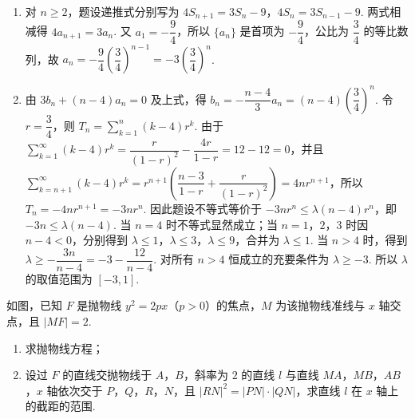 \begin{solution}
\begin{enumerate}
\item 对 \(n\geq2\)，题设递推式分别写为
\(4S_{n+1}=3S_n-9\)，\(4S_n=3S_{n-1}-9\). 两式相减得 \(4a_{n+1}=3a_n\). 又 \(a_1=-\dfrac94\)，所以 \(\{a_n\}\) 是首项为 \(-\dfrac94\)，公比为 \(\dfrac34\) 的等比数列，故
\(a_n=-\dfrac94\left(\dfrac34\right)^{n-1}=-3\left(\dfrac34\right)^n\).

\item 由 \(3b_n+(n-4)a_n=0\) 及上式，得
\(b_n=-\dfrac{n-4}{3}a_n=(n-4)\left(\dfrac34\right)^n\). 令 \(r=\dfrac34\)，则
\(T_n=\sum_{k=1}^{n}(k-4)r^k\). 由于
\(\sum_{k=1}^{\infty}(k-4)r^k=\dfrac r{(1-r)^2}-\dfrac{4r}{1-r}=12-12=0\)，并且
\(\sum_{k=n+1}^{\infty}(k-4)r^k=r^{n+1}\left(\dfrac{n-3}{1-r}+\dfrac r{(1-r)^2}\right)=4nr^{n+1}\)，所以 \(T_n=-4nr^{n+1}=-3nr^n\).
因此题设不等式等价于
\(-3nr^n\leq\lambda(n-4)r^n\)，即 \(-3n\leq\lambda(n-4)\).
当 \(n=4\) 时不等式显然成立；当 \(n=1\)，\(2\)，\(3\) 时因 \(n-4<0\)，分别得到 \(\lambda\leq1\)，\(\lambda\leq3\)，\(\lambda\leq9\)，合并为 \(\lambda\leq1\). 当 \(n>4\) 时，得到
\(\lambda\geq-\dfrac{3n}{n-4}=-3-\dfrac{12}{n-4}\). 对所有 \(n>4\) 恒成立的充要条件为 \(\lambda\geq-3\). 所以 \(\lambda\) 的取值范围为 \([-3,1]\).
\end{enumerate}
\end{solution}

\begin{problem}
如图，已知 \(F\) 是抛物线 \(y^2=2px\)（\(p>0\)）的焦点，\(M\) 为该抛物线准线与 \(x\) 轴交点，且 \(|MF|=2\).

\begin{enumerate}
\item 求抛物线方程；

\item 设过 \(F\) 的直线交抛物线于 \(A\)，\(B\)，斜率为 \(2\) 的直线 \(l\) 与直线 \(MA\)，\(MB\)，\(AB\)，\(x\) 轴依次交于 \(P\)，\(Q\)，\(R\)，\(N\)，且 \(|RN|^2=|PN|\cdot|QN|\)，求直线 \(l\) 在 \(x\) 轴上的截距的范围.
\end{enumerate}

\end{problem}

